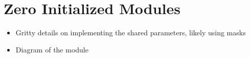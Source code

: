 \documentclass[10pt,twocolumn,letterpaper]{article}
\begin{document}
\section{Zero Initialized Modules}
\begin{itemize}
	\item Gritty details on implementing the shared parameters, likely using masks
    \item Diagram of the module
\end{itemize}
\end{document}
